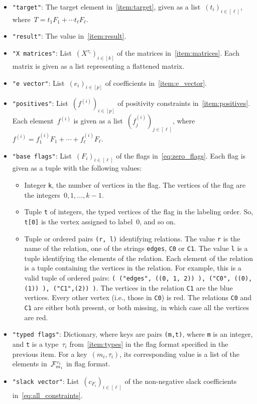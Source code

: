 \documentclass[11pt,a4paper,reqno]{amsart}
\begin{document}
\begin{itemize}
\item \verb|"target"|: The target element in~\ref{item:target}, given as a
  list~$(t_i)_{i \in [\ell]}$, where~$T = t_1F_1 + \cdots t_\ell F_\ell$.
\item \verb|"result"|: The value in~\ref{item:result}.
\item \verb|"X matrices"|: List~$(X^{\tau_i})_{i \in [k]}$ of the matrices in~\ref{item:matrices}. Each
  matrix is given as a list representing a flattened matrix.
\item \verb|"e vector"|: List~$(e_i)_{i \in [p]}$ of coefficients in~\ref{item:e_vector}.
\item \verb|"positives"|: List~$(f^{(i)})_{i \in [p]}$ of positivity constraints
  in~\ref{item:positives}. Each element~$f^{(i)}$ is given as a
  list~$(f^{(i)}_j)_{j \in [\ell]}$, where~$f^{(i)} = f^{(i)}_1 F_1 + \cdots + f^{(i)}_\ell F_\ell$.
\item \verb|"base flags"|: List~$(F_i)_{i \in [\ell]}$ of the flags in~\eqref{eq:zero_flags}. Each
  flag is given as a tuple with the following values:
  \begin{itemize}
  \item Integer \verb|k|, the number of vertices in the flag. The vertices of the flag
    are the integers~$0, 1, \dots, k - 1$.
  \item Tuple \verb|t| of integers, the typed vertices of the flag in the labeling
    order. So, \verb|t[0]| is the vertex assigned to label~$0$, and so on.
  \item Tuple or ordered pairs \verb|(r, l)| identifying relations. The value \verb|r| is
    the name of the relation, one of the strings \verb|edges|, \verb|C0| or
    \verb|C1|. The value \verb|l| is a tuple identifying the elements of the
    relation. Each element of the relation is a tuple containing the vertices in the
    relation. For example, this is a valid tuple of ordered pairs:
    \verb|( ("edges", ((0, 1, 2)) ), ("C0", ((0), (1)) ), ("C1",(2)) )|. The vertices
    in the relation \verb|C1| are the blue vertices. Every other vertex (i.e., those
    in \verb|C0|) is red. The relations \verb|C0| and \verb|C1| are either both
    present, or both missing, in which case all the vertices are red.
  \end{itemize}
\item \verb|"typed flags"|: Dictionary, where keys are pairs \verb|(m,t)|, where \verb|m|
  is an integer, and \verb|t| is a type~$\tau_i$ from~\ref{item:types} in the flag format specified
  in the previous item. For a key~$(m_i, \tau_i)$, its corresponding value is a list of
  the elements in~${\mathcal F}_{m_i}^{\tau_i}$ in flag format.
\item \verb|"slack vector"|: List~$(c_{F_i})_{i \in [\ell]}$ of the non-negative slack
  coefficients in~\eqref{eq:all_constraints}.
\end{itemize}
\end{document}
